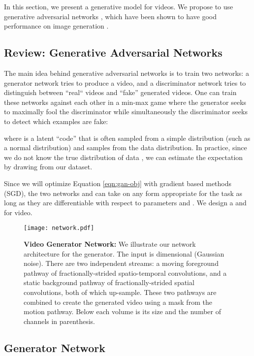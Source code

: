 \documentclass{article}
\begin{document}
In this section, we present a generative model for videos.  We propose to use generative adversarial networks \cite{goodfellow2014generative}, which have been shown to have good performance on image generation \cite{radford2015unsupervised,denton2015deep}. 


\subsection{Review: Generative Adversarial Networks}

The main idea behind generative adversarial networks \cite{goodfellow2014generative} is to train two networks: a generator network  tries to produce a video, and a discriminator network  tries to distinguish between ``real`` videos and ``fake'' generated videos. One can train these networks against each other in a min-max game where the generator seeks to maximally fool the discriminator while simultaneously the discriminator seeks to detect which examples are fake:

where  is a latent ``code'' that is often sampled from a simple distribution (such as a normal distribution) and  samples from the data distribution. In practice, since we do not know the true distribution of data , we can estimate the expectation by drawing from our dataset.

Since we will optimize Equation \ref{eqn:gan-obj} with gradient based methods (SGD), the two networks  and  can take on any form appropriate for the task as long as they are differentiable with respect to parameters  and . We design a  and  for video.

\begin{figure}
    \centering
    \texttt{[image: network.pdf]}
    \caption{\textbf{Video Generator Network:} We illustrate our network architecture for the generator. The input is  dimensional (Gaussian noise). There are two independent streams: a moving foreground pathway of fractionally-strided spatio-temporal convolutions, and a static background pathway of fractionally-strided spatial convolutions, both of which up-sample. These two pathways are combined to create the generated video using a mask from the motion pathway. Below each volume is its size and the number of channels in parenthesis.}
    \label{fig:network}
\end{figure}

\subsection{Generator Network}
\end{document}
